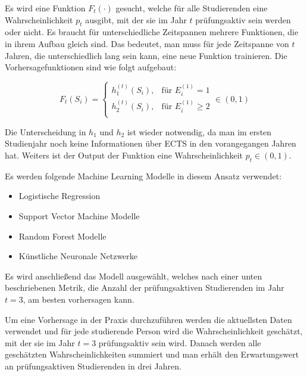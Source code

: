 Es wird eine Funktion $F_t(\cdot)$ gesucht, welche f\"ur alle Studierenden eine Wahrscheinlichkeit $p_t$ ausgibt, mit der
sie im Jahr $t$ pr\"ufungsaktiv sein werden oder nicht. Es braucht f\"ur unterschiedliche Zeitspannen mehrere Funktionen, die in ihrem Aufbau gleich sind.
Das bedeutet, man muss f\"ur jede Zeitspanne von $t$ Jahren, die unterschiedlich lang sein kann, eine neue Funktion trainieren.
Die Vorhersagefunktionen sind wie folgt aufgebaut:

$$
  F_t(S_i)=
  \left\{
  \begin{array}{lr}
    h_1^{(t)}(S_i), & \text{für }E_i^{(1)} = 1    \\
    h_2^{(t)}(S_i), & \text{für }E_i^{(1)} \geq 2 \\
  \end{array}
  \right.
  \in (0,1)
$$

Die Unterscheidung in $h_1$ und $h_2$ ist wieder notwendig, da man im ersten Studienjahr noch keine Informationen \"uber ECTS in den vorangegangen Jahren hat.
Weiters ist der Output der Funktion eine Wahrscheinlichkeit $p_t \in (0,1)$.

Es werden folgende Machine Learning Modelle in diesem Ansatz verwendet:
\begin{itemize}
  \item Logistische Regression
  \item Support Vector Machine Modelle
  \item Random Forest Modelle
  \item K\"unstliche Neuronale Netzwerke
\end{itemize}

Es wird anschlie{\ss}end das Modell ausgew\"ahlt, welches nach einer unten beschriebenen Metrik, die Anzahl der pr\"ufungsaktiven Studierenden
im Jahr $t = 3$, am besten vorhersagen kann.

Um eine Vorhersage in der Praxis durchzuf\"uhren werden die aktuellsten Daten verwendet und f\"ur jede studierende Person wird die
Wahrscheinlichkeit gesch\"atzt, mit der sie im Jahr $t=3$ pr\"ufungsaktiv sein wird. Danach werden alle gesch\"atzten Wahrscheinlichkeiten summiert und
man erh\"alt den Erwartungswert an pr\"ufungsaktiven Studierenden in drei Jahren.




